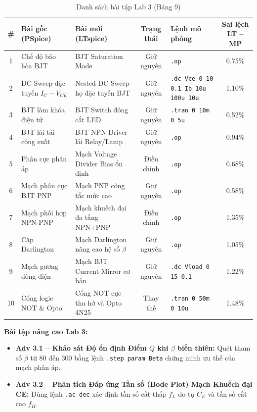 \documentclass[12pt,a4paper]{report}
\begin{document}
\begin{table}[H]
\centering
\caption{Danh sách bài tập Lab 3 (Bảng 9)}
\label{tab:bang9_lab3}
\renewcommand{\arraystretch}{1.2}
\small
\begin{tabularx}{\textwidth}{|c|p{4.0cm}|p{4.0cm}|c|l|c|}
\hline
\rowcolor{codebg}
\textbf{\#} & \textbf{Bài gốc (PSpice)} & \textbf{Bài mới (LTspice)} & \textbf{Trạng thái} & \textbf{Lệnh mô phỏng} & \textbf{Sai lệch LT -- MP} \\ \hline
1 & Chế độ bão hòa BJT & BJT Saturation Mode & Giữ nguyên & \lstinline|.op| & 0.75\% \\ \hline
2 & DC Sweep đặc tuyến $I_C-V_{CE}$ & Nested DC Sweep họ đặc tuyến BJT & Giữ nguyên & \lstinline|.dc Vce 0 10 0.1 Ib 10u 100u 10u| & 1.10\% \\ \hline
3 & BJT làm khóa điện tử & BJT Switch đóng cắt LED & Giữ nguyên & \lstinline|.tran 0 10m 0 5u| & 0.52\% \\ \hline
4 & BJT lái tải công suất & BJT NPN Driver lái Relay/Lamp & Giữ nguyên & \lstinline|.op| & 0.94\% \\ \hline
5 & Phân cực phân áp & Mạch Voltage Divider Bias ổn định & Điều chỉnh & \lstinline|.op| & 0.68\% \\ \hline
6 & Mạch phân cực BJT PNP & Mạch PNP công tắc mức cao & Giữ nguyên & \lstinline|.op| & 0.58\% \\ \hline
7 & Mạch phối hợp NPN-PNP & Mạch khuếch đại đa tầng NPN+PNP & Điều chỉnh & \lstinline|.op| & 1.35\% \\ \hline
8 & Cặp Darlington & Mạch Darlington nâng cao hệ số $\beta$ & Giữ nguyên & \lstinline|.op| & 1.05\% \\ \hline
9 & Mạch gương dòng điện & Mạch BJT Current Mirror cơ bản & Giữ nguyên & \lstinline|.dc Vload 0 15 0.1| & 1.22\% \\ \hline
10 & Cổng logic NOT \& Opto & Cổng NOT cực thu hở và Opto 4N25 & Thay thế & \lstinline|.tran 0 50m 0 10u| & 1.48\% \\ \hline
\end{tabularx}
\end{table}

\textbf{Bài tập nâng cao Lab 3:}
\begin{itemize}[noitemsep]
    \item \textbf{Adv 3.1 -- Khảo sát Độ ổn định Điểm $Q$ khi $\beta$ biến thiên:} Quét tham số $\beta$ từ 80 đến 300 bằng lệnh \lstinline|.step param Beta| chứng minh ưu thế của mạch phân áp.
    \item \textbf{Adv 3.2 -- Phân tích Đáp ứng Tần số (Bode Plot) Mạch Khuếch đại CE:} Dùng lệnh \lstinline|.ac dec| xác định tần số cắt thấp $f_L$ do tụ $C_E$ và tần số cắt cao $f_H$.
\end{itemize}
\end{document}
